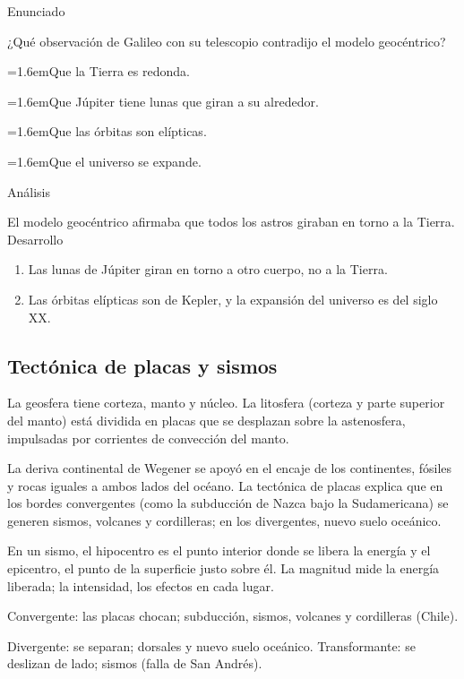 \documentclass[10pt,a4paper,twocolumn]{article}
\newcommand{\alternativa}[2]{\par\noindent\hangindent=1.6em\hangafter=1\makebox[1.6em][l]{\tecla{#1}}#2\par}
\newcommand{\clave}[1]{\par\smallskip{\sffamily\footnotesize\color{esmeralda} Clave \teclaok{#1}}\par}
\begin{document}
\begin{ejemplo}
{\sffamily\footnotesize\color{zinc500} Enunciado}\par
¿Qué observación de Galileo con su telescopio contradijo el modelo geocéntrico?
\alternativa{A}{Que la Tierra es redonda.}
\alternativa{B}{Que Júpiter tiene lunas que giran a su alrededor.}
\alternativa{C}{Que las órbitas son elípticas.}
\alternativa{D}{Que el universo se expande.}
\clave{B}
{\sffamily\footnotesize\color{zinc500} Análisis}\par El modelo geocéntrico afirmaba que todos los astros giraban en torno a la Tierra.
{\sffamily\footnotesize\color{zinc500} Desarrollo}
\begin{enumerate}
  \item Las lunas de Júpiter giran en torno a otro cuerpo, no a la Tierra.
  \item Las órbitas elípticas son de Kepler, y la expansión del universo es del siglo XX.
\end{enumerate}
\end{ejemplo}

\subsection{Tectónica de placas y sismos}

La geosfera tiene corteza, manto y núcleo. La litosfera (corteza y parte superior del manto) está dividida en placas que se desplazan sobre la astenosfera, impulsadas por corrientes de convección del manto.

La deriva continental de Wegener se apoyó en el encaje de los continentes, fósiles y rocas iguales a ambos lados del océano. La tectónica de placas explica que en los bordes convergentes (como la subducción de Nazca bajo la Sudamericana) se generen sismos, volcanes y cordilleras; en los divergentes, nuevo suelo oceánico.

En un sismo, el hipocentro es el punto interior donde se libera la energía y el epicentro, el punto de la superficie justo sobre él. La magnitud mide la energía liberada; la intensidad, los efectos en cada lugar.

\begin{definicion}
Convergente: las placas chocan; subducción, sismos, volcanes y cordilleras (Chile).

Divergente: se separan; dorsales y nuevo suelo oceánico. Transformante: se deslizan de lado; sismos (falla de San Andrés).
\end{definicion}
\end{document}
